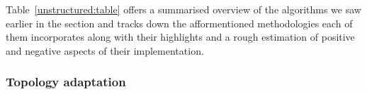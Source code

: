 Table~\ref{unstructured:table} offers a summarised overview of the algorithms
we saw earlier in the section and tracks down the afformentioned methodologies
each of them incorporates along with their highlights and a rough estimation of
positive and negative aspects of their implementation.





\subsubsection{Topology adaptation}
\begin{figure}[ht]
\centering
{}\qquad\qquad
{}
\end{figure}
